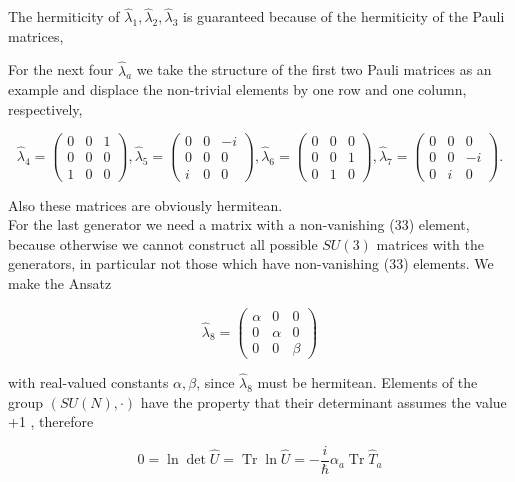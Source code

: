 \documentclass[10pt, letterpaper]{article}
\begin{document}
The hermiticity of $\hat{\lambda}_{1}, \hat{\lambda}_{2}, \hat{\lambda}_{3}$ is guaranteed because of the hermiticity of the Pauli matrices,

For the next four $\hat{\lambda}_{a}$ we take the structure of the first two Pauli matrices as an example and displace the non-trivial elements by one row and one column, respectively,

$$
\hat{\lambda}_{4}=\left(\begin{array}{lll}
0 & 0 & 1 \\
0 & 0 & 0 \\
1 & 0 & 0
\end{array}\right), \hat{\lambda}_{5}=\left(\begin{array}{ccc}
0 & 0 & -i \\
0 & 0 & 0 \\
i & 0 & 0
\end{array}\right), \hat{\lambda}_{6}=\left(\begin{array}{lll}
0 & 0 & 0 \\
0 & 0 & 1 \\
0 & 1 & 0
\end{array}\right), \hat{\lambda}_{7}=\left(\begin{array}{ccc}
0 & 0 & 0 \\
0 & 0 & -i \\
0 & i & 0
\end{array}\right) .
$$

Also these matrices are obviously hermitean.\\
For the last generator we need a matrix with a non-vanishing (33) element, because otherwise we cannot construct all possible $S U(3)$ matrices with the generators, in particular not those which have non-vanishing (33) elements. We make the Ansatz

$$
\hat{\lambda}_{8}=\left(\begin{array}{ccc}
\alpha & 0 & 0 \\
0 & \alpha & 0 \\
0 & 0 & \beta
\end{array}\right)
$$

with real-valued constants $\alpha, \beta$, since $\hat{\lambda}_{8}$ must be hermitean. Elements of the group $(S U(N), \cdot)$ have the property that their determinant assumes the value +1 , therefore

$$
0=\ln \operatorname{det} \hat{U}=\operatorname{Tr} \ln \hat{U}=-\frac{i}{\hbar} \alpha_{a} \operatorname{Tr} \hat{T}_{a}
$$
\end{document}
